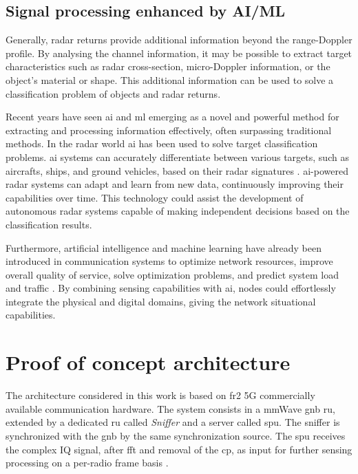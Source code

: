 	\subsection{Signal processing enhanced by AI/ML}
	Generally, radar returns provide additional information beyond the range-Doppler profile. 
	By analysing the channel information, it may be possible to extract target characteristics such as radar cross-section, micro-Doppler information, or the object's material or shape.
	This additional information can be used to solve a classification problem of objects and radar returns.
	
	Recent years have seen \gls{ai} and \gls{ml} emerging as a novel and powerful method for extracting and processing information effectively, often surpassing traditional methods.
	In the radar world \gls{ai} has been used to solve target classification problems. 
	\Gls{ai} systems can accurately differentiate between various targets, such as aircrafts, ships, and ground vehicles, based on their radar signatures \cite{survey_radar_AIML}. 
	\gls{ai}-powered radar systems can adapt and learn from new data, continuously improving their capabilities over time. 
	This technology could assist the development of autonomous radar systems capable of making independent decisions based on the classification results. 
	
	 Furthermore, artificial intelligence and machine learning have already been introduced in communication systems to optimize network resources, improve overall quality of service, solve optimization problems, and predict system load and traffic \cite{30_years_ai_survey}. 
	 By combining sensing capabilities with \gls{ai}, nodes could effortlessly integrate the physical and digital domains, giving the network situational capabilities.
	


\section{Proof of concept architecture}
	\label{sec:intro-PoCarchitecture}
	
	The architecture considered in this work is based on \gls{fr2} 5G commercially available communication hardware.
	The system consists in a mmWave \gls{gnb} \gls{ru}, extended by a dedicated \gls{ru} called \textit{Sniffer} and a server called \gls{spu}. 
	The sniffer is synchronized with the \gls{gnb} by the same synchronization source. 
	The \gls{spu} receives the complex IQ signal,  after \gls{fft} and removal of the \gls{cp}, as input for further sensing processing on a per-radio frame basis \cite{Wild_Grudnitsky_Mandelli_Henninger_Guan_Schaich_2023}.
	
